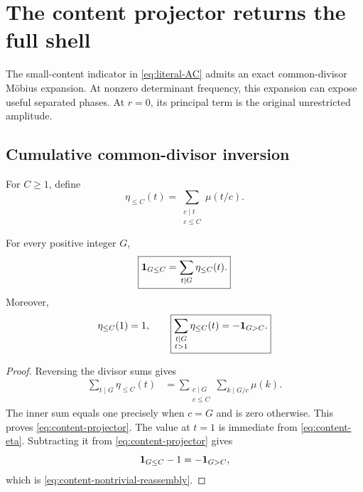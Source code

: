 \section{The content projector returns the full shell}
\label{sec:content-projector}

The small-content indicator in \eqref{eq:literal-AC} admits an exact
common-divisor M\"obius expansion.  At nonzero determinant frequency,
this expansion can expose useful separated phases.  At \(r=0\), its
principal term is the original unrestricted amplitude.

\subsection{Cumulative common-divisor inversion}

For \(C\ge1\), define
\begin{equation}
 \eta_{\le C}(t)
 =\sum_{\substack{c\mid t\\c\le C}}\mu(t/c).
 \label{eq:content-eta}
\end{equation}

\begin{lemma}
\label{lem:content-projector}
For every positive integer \(G\),
\begin{equation}
 \boxed{
 \mathbf 1_{G\le C}
 =\sum_{t\mid G}\eta_{\le C}(t).}
 \label{eq:content-projector}
\end{equation}
Moreover,
\begin{equation}
 \eta_{\le C}(1)=1,
 \qquad
 \boxed{
 \sum_{\substack{t\mid G\\t>1}}\eta_{\le C}(t)
 =-\mathbf 1_{G>C}.}
 \label{eq:content-nontrivial-reassembly}
\end{equation}
\end{lemma}

\begin{proof}
Reversing the divisor sums gives
\begin{align*}
 \sum_{t\mid G}\eta_{\le C}(t)
 &=
 \sum_{\substack{c\mid G\\c\le C}}
 \sum_{k\mid G/c}\mu(k).
\end{align*}
The inner sum equals one precisely when \(c=G\) and is zero
otherwise.  This proves \eqref{eq:content-projector}.  The value at
\(t=1\) is immediate from \eqref{eq:content-eta}.  Subtracting it
from \eqref{eq:content-projector} gives
\[
 \mathbf 1_{G\le C}-1=-\mathbf 1_{G>C},
\]
which is \eqref{eq:content-nontrivial-reassembly}.
\end{proof}

